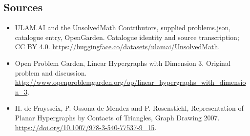 \documentclass[11pt,a4paper]{article}
\begin{document}
\subsection{Sources}
\begin{itemize}
\item[S1] ULAM.AI and the UnsolvedMath Contributors, supplied problems.json, catalogue entry, OpenGarden. Catalogue identity and source transcription; CC BY 4.0.
\url{https://huggingface.co/datasets/ulamai/UnsolvedMath}.
\item[S2] Open Problem Garden, Linear Hypergraphs with Dimension 3. Original problem and discussion.
\url{http://www.openproblemgarden.org/op/linear_hypergraphs_with_dimension_3}.
\item[S3] H. de Fraysseix, P. Ossona de Mendez and P. Rosenstiehl, Representation of Planar Hypergraphs by Contacts of Triangles, Graph Drawing 2007.
\url{https://doi.org/10.1007/978-3-540-77537-9_15}.
\end{itemize}
\end{document}
